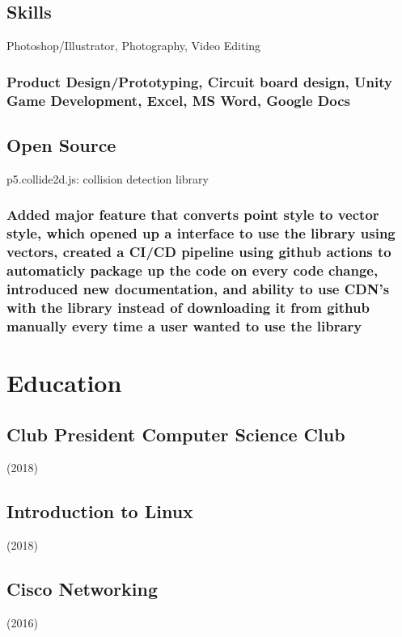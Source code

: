 \documentclass{article}
\begin{document}
		\subsection{Skills}Photoshop/Illustrator, Photography, Video Editing
		\vspace{-3mm}
		\subsubsection{Product Design/Prototyping, Circuit board design,  Unity Game Development, Excel, MS Word, Google Docs}
		\vspace{-3mm}

    	\subsection{Open Source} p5.collide2d.js: collision detection library
		\subsubsection{Added major feature that converts point style to vector style, which opened up a interface to use the library using vectors, created a CI/CD pipeline using github actions to automaticly package up the code on every code change, introduced new documentation, and ability to use CDN's with the library instead of downloading it from github manually every time a user wanted to use the library }
		\vspace{-3mm}
			
    		    		
	\section{Education}
        \subsection{Club President  Computer Science Club}  (2018)
        \vspace{-2mm}   
		 
		\subsection{Introduction to Linux}  (2018)
        \vspace{-2mm}   

		\subsection{Cisco Networking}  (2016)
        \vspace{-2mm}   
         
\end{document}
